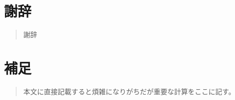 \documentclass[uplatex,openany,oneside,a4j,11pt]{jsbook}
\begin{document}
\chapter{謝辞}
    \begin{abstract}
        謝辞
    \end{abstract}
    

\chapter{補足}
    \begin{abstract}
        本文に直接記載すると煩雑になりがちだが重要な計算をここに記す。
    \end{abstract}
    


%
\printbibliography[title=参考文献]
\end{document}
